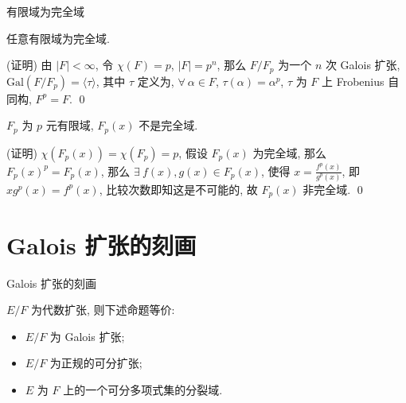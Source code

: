 \begin{frame}{有限域为完全域}

\begin{cor}[有限域为完全域]
任意有限域为完全域.
\end{cor}

\startproof[bg=yellow, fg=red](证明)
由 $|F| < \infty$, 令 $\chi(F) = p$, $|F| = p^n$,
那么 $F/F_p$ 为一个 $n$ 次 Galois 扩张, $\mathrm{Gal}(F/F_p) = \langle \tau \rangle$,
其中 $\tau$ 定义为, $\forall\ \alpha \in F$, $\tau(\alpha) = \alpha^p$,
$\tau$ 为 $F$ 上 Frobenius 自同构, $F^p = F$.
\qed

\pause

\begin{eg}
$F_p$ 为 $p$ 元有限域, $F_p(x)$ 不是完全域.
\end{eg}

\startproof[bg=yellow, fg=red](证明)
$\chi(F_p(x)) = \chi(F_p) = p$,
假设 $F_p(x)$ 为完全域, 那么 $F_p(x)^p = F_p(x)$,
那么 $\exists\ f(x), g(x) \in F_p(x)$, 使得 $x = \frac{f^p(x)}{g^p(x)}$,
即 $x g^p(x) = f^p(x)$, 比较次数即知这是不可能的,
故 $F_p(x)$ 非完全域.
\qed

\end{frame}


\section[Galois]{Galois 扩张的刻画}


\begin{frame}{Galois 扩张的刻画}

\begin{thm}
$E/F$ 为代数扩张, 则下述命题等价:
\begin{itemize}
\item[(i)] $E/F$ 为 Galois 扩张;
\item[(ii)] $E/F$ 为正规的可分扩张;
\item[(iii)] $E$ 为 $F$ 上的一个可分多项式集的分裂域.
\end{itemize}
\end{thm}

\end{frame}



